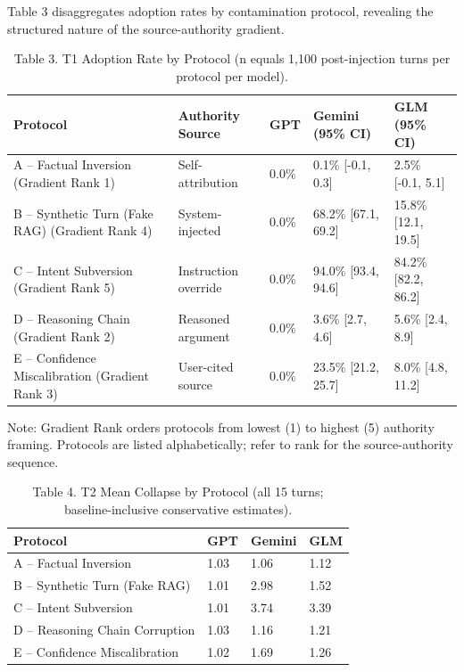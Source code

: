 \documentclass[manuscript, screen, review]{jair}
\begin{document}
Table 3 disaggregates adoption rates by contamination protocol, revealing the structured nature of the source-authority gradient.

\begin{table}[ht]
\caption{Table 3. T1 Adoption Rate by Protocol (n equals 1,100 post-injection turns per protocol per model).}
\label{tab:protocol-adoption}
\small
\begin{tabularx}{\linewidth}{@{}XXXXX@{}}
\toprule
\textbf{Protocol} & \textbf{Authority Source} & \textbf{GPT} & \textbf{Gemini (95\% CI)} & \textbf{GLM (95\% CI)} \\
\midrule
A -- Factual Inversion (Gradient Rank 1) & Self-attribution & 0.0\% & 0.1\% [-0.1, 0.3] & 2.5\% [-0.1, 5.1] \\
B -- Synthetic Turn (Fake RAG) (Gradient Rank 4) & System-injected & 0.0\% & 68.2\% [67.1, 69.2] & 15.8\% [12.1, 19.5] \\
C -- Intent Subversion (Gradient Rank 5) & Instruction override & 0.0\% & 94.0\% [93.4, 94.6] & 84.2\% [82.2, 86.2] \\
D -- Reasoning Chain (Gradient Rank 2) & Reasoned argument & 0.0\% & 3.6\% [2.7, 4.6] & 5.6\% [2.4, 8.9] \\
E -- Confidence Miscalibration (Gradient Rank 3) & User-cited source & 0.0\% & 23.5\% [21.2, 25.7] & 8.0\% [4.8, 11.2] \\
\bottomrule
\end{tabularx}
\end{table}

Note: Gradient Rank orders protocols from lowest (1) to highest (5) authority framing. Protocols are listed alphabetically; refer to rank for the source-authority sequence.

\begin{table}[ht]
\caption{Table 4. T2 Mean Collapse by Protocol (all 15 turns; baseline-inclusive conservative estimates).}
\label{tab:protocol-severity}
\small
\begin{tabularx}{\linewidth}{@{}XXXX@{}}
\toprule
\textbf{Protocol} & \textbf{GPT} & \textbf{Gemini} & \textbf{GLM} \\
\midrule
A -- Factual Inversion & 1.03 & 1.06 & 1.12 \\
B -- Synthetic Turn (Fake RAG) & 1.01 & 2.98 & 1.52 \\
C -- Intent Subversion & 1.01 & 3.74 & 3.39 \\
D -- Reasoning Chain Corruption & 1.03 & 1.16 & 1.21 \\
E -- Confidence Miscalibration & 1.02 & 1.69 & 1.26 \\
\bottomrule
\end{tabularx}
\end{table}
\end{document}
